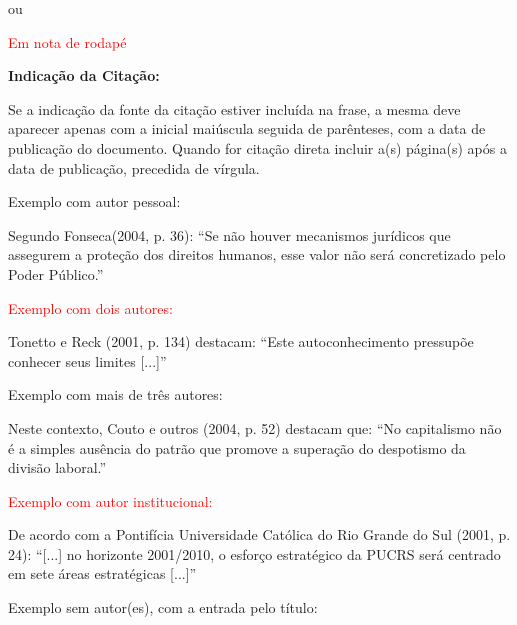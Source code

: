     \bigskip

    {\color{red} ou}

    \textcolor{red}{Em nota de rodapé}

    \bigskip

    {\centering\bfseries\color{red} Indicação da Citação: \par}

    \bigskip

    Se a indicação da fonte da citação estiver incluída na frase, a mesma deve aparecer apenas com a inicial maiúscula seguida de parênteses, com a data de publicação do documento. Quando for citação direta incluir a(s) página(s) após a data de publicação, precedida de vírgula.

    \bigskip

    {\color{red} Exemplo com autor pessoal:}

    \bigskip

    Segundo Fonseca(2004, p. 36): ``Se não houver mecanismos jurídicos que assegurem a proteção dos direitos humanos, esse valor não será concretizado pelo Poder Público.''

    \bigskip

    \textcolor{red}{Exemplo com dois autores: }

    \bigskip

    Tonetto e Reck (2001, p. 134) destacam: ``Este autoconhecimento pressupõe conhecer seus limites [...]''

    \bigskip

    {\color{red} Exemplo com mais de três autores:}

    \bigskip

    Neste contexto, Couto e outros (2004, p. 52) destacam que: ``No capitalismo não é a simples ausência do patrão que promove a superação do despotismo da divisão laboral.''

    \bigskip

    \textcolor{red}{Exemplo com autor institucional: }

    \bigskip

    De acordo com a Pontifícia Universidade Católica do Rio Grande do Sul (2001, p. 24): ``[...] no horizonte 2001/2010, o esforço estratégico da PUCRS será centrado em sete áreas estratégicas [...]''

    \bigskip

    {\color{red} Exemplo sem autor(es), com a entrada pelo título:}

    \bigskip

